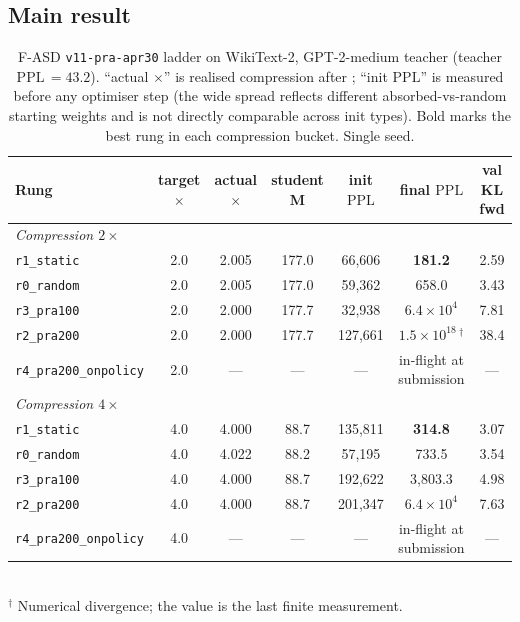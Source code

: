 \documentclass[11pt]{article}
\newcommand{\PPL}{\ensuremath{\mathrm{PPL}}}
\newcommand{\fasd}{\textsc{F-ASD}}
\begin{document}
\subsection{Main result}

\begin{table}[t]
\centering
\small
\caption{\fasd{} \texttt{v11-pra-apr30} ladder on WikiText-2,
GPT-2-medium teacher (teacher \PPL{}\,$=\!43.2$). ``actual $\times$''
is realised compression after ; ``init \PPL{}'' is
measured before any optimiser step (the wide spread reflects different
absorbed-vs-random starting weights and is not directly comparable
across init types). Bold marks the best rung in each compression bucket.
Single seed.}
\label{tab:v11}
\setlength{\tabcolsep}{4pt}
\footnotesize
\begin{tabular}{lcccccc}
\toprule
Rung & target $\times$ & actual $\times$ & student M & init \PPL{} & \textbf{final \PPL{}} & val KL fwd \\
\midrule
\multicolumn{7}{l}{\textit{Compression $2\times$}} \\
\texttt{r1\_static}            & 2.0 & 2.005 & 177.0 & \phantom{0}66{,}606 & \textbf{181.2}                     & \phantom{0}2.59 \\
\texttt{r0\_random}            & 2.0 & 2.005 & 177.0 & \phantom{0}59{,}362 & \phantom{00,}658.0                 & \phantom{0}3.43 \\
\texttt{r3\_pra100}            & 2.0 & 2.000 & 177.7 & \phantom{0}32{,}938 & $6.4\!\times\!10^{4}$              & \phantom{0}7.81 \\
\texttt{r2\_pra200}            & 2.0 & 2.000 & 177.7 & 127{,}661           & $1.5\!\times\!10^{18}\,^\dagger$   & 38.4 \\
\texttt{r4\_pra200\_onpolicy}  & 2.0 & ---   & ---   & ---                 & in-flight at submission           & ---  \\
\midrule
\multicolumn{7}{l}{\textit{Compression $4\times$}} \\
\texttt{r1\_static}            & 4.0 & 4.000 & \phantom{0}88.7 & 135{,}811           & \textbf{314.8}                     & \phantom{0}3.07 \\
\texttt{r0\_random}            & 4.0 & 4.022 & \phantom{0}88.2 & \phantom{0}57{,}195 & \phantom{00,}733.5                 & \phantom{0}3.54 \\
\texttt{r3\_pra100}            & 4.0 & 4.000 & \phantom{0}88.7 & 192{,}622           & \phantom{0}3{,}803.3               & \phantom{0}4.98 \\
\texttt{r2\_pra200}            & 4.0 & 4.000 & \phantom{0}88.7 & 201{,}347           & $6.4\!\times\!10^{4}$              & \phantom{0}7.63 \\
\texttt{r4\_pra200\_onpolicy}  & 4.0 & ---   & ---   & ---                 & in-flight at submission           & --- \\
\bottomrule
\end{tabular}\\[4pt]
{\footnotesize $^\dagger$ Numerical divergence; the value is the last finite measurement.}
\end{table}
\end{document}
